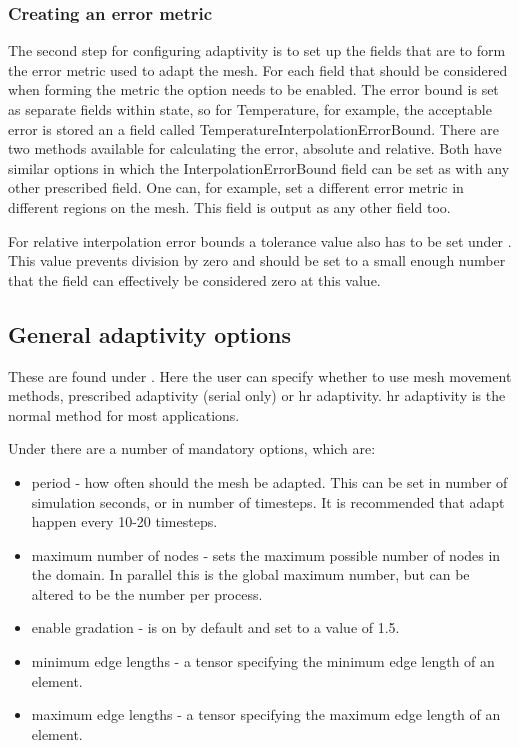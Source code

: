 \subsubsection{Creating an error metric}
\label{sect:configuring_fluidity_error_metric}

The second step for configuring adaptivity is to set up the fields that are to form the error metric used
to adapt the mesh. For each field that should be considered when forming the metric the option
 needs to be enabled. The error bound is set as separate fields within 
state, so for Temperature, for example, the acceptable error is stored an a field called 
TemperatureInterpolationErrorBound. There are two methods available for calculating the error, absolute and relative.
Both have similar options in which the InterpolationErrorBound field can be set as with any other prescribed field.
One can, for example, set a different error metric in different regions on the mesh. This field
is output as any other field too.

For relative interpolation error bounds a tolerance value also has to be set under \newline
{}. This value prevents division by zero
and should be set to a small enough number that the field can effectively be considered zero at this value.

\subsection{General adaptivity options}
\label{sect:configuring_fluidity_adaptivity_options}

These are found under . Here the user can specify whether to use mesh movement methods, 
prescribed adaptivity (serial only) or hr adaptivity. hr adaptivity is the normal method for most applications.

Under  there are a number of mandatory options, which are:
\begin{itemize}
\item period - how often should the mesh be adapted. This can be set in number of simulation seconds, 
or in number of timesteps. It is recommended that adapt happen every 10-20 timesteps.
\item maximum number of nodes - sets the maximum possible number of nodes in the domain. In parallel this is the
global maximum number, but can be altered to be the number per process.
\item enable gradation - is on by default and set to a value of 1.5. 
\item minimum edge lengths - a tensor specifying the minimum edge length of an element.
\item maximum edge lengths - a tensor specifying the maximum edge length of an element.
\end{itemize}

